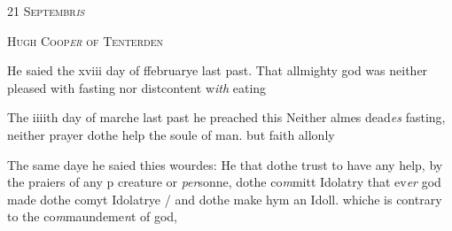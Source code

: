 \documentclass[12pt, a4paper]{book}
\begin{document}
               
				\begin{center} \begin{large} {\scshape 
                  21 Septembr\textit{is}
                  
               } \end{large} \end{center}
			
               
               	
				\begin{center}  {\scshape Hugh Coop\textit{er} of Tenterden}  \end{center}
			
               	
               	
               		
				\marginpar[\vspace{0.5cm}{\textcolor{Gray}{fastynge}}]{}
			
               		
		\ifthenelse{\isodd{\thepage}}
		{\reversemarginpar}
		{\normalmarginpar}
		He saied the xviii day of ffebruarye last past. That allmighty god was neither pleased 
			with fasting nor distcontent w\textit{ith} eating
               	
               		
			
               		
		\ifthenelse{\isodd{\thepage}}
		{\reversemarginpar}
		{\normalmarginpar}
		The iiiith day of marche last past he preached this
 Neither almes dead\textit{es} fasting, neither prayer
 dothe help the soule of man. but faith allonly
               	
               	
			
			
               		
				\marginpar[\vspace{0.5cm}{\textcolor{Gray}{seditious}}]{}
			
               		
		\ifthenelse{\isodd{\thepage}}
		{\reversemarginpar}
		{\normalmarginpar}
		The same daye he saied thies wourdes: He that
 dothe trust to have any help, by the praiers of any
 p creature or \textit{per}sonne, dothe co\textit{m}mitt Idolatry that
 ev\textit{er} god made dothe comyt Idolatrye / and dothe
 make hym an Idoll. whiche is contrary to the
 co\textit{m}maundeme\textit{n}t of god,
               	
\end{document}
